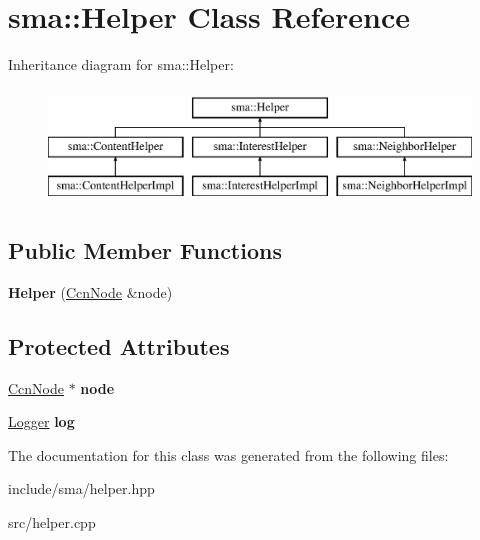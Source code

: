 \hypertarget{classsma_1_1Helper}{\section{sma\-:\-:Helper Class Reference}
\label{classsma_1_1Helper}
}
Inheritance diagram for sma\-:\-:Helper\-:\begin{figure}[H]
\begin{center}
\leavevmode
\includegraphics[height=3.000000cm]{classsma_1_1Helper}
\end{center}
\end{figure}
\subsection*{Public Member Functions}
\begin{DoxyCompactItemize}
\item 
\hypertarget{classsma_1_1Helper_ad7183fc108e95cea361bd1637aaef450}{{\bfseries Helper} (\hyperlink{classsma_1_1CcnNode}{Ccn\-Node} \&node)}\label{classsma_1_1Helper_ad7183fc108e95cea361bd1637aaef450}

\end{DoxyCompactItemize}
\subsection*{Protected Attributes}
\begin{DoxyCompactItemize}
\item 
\hypertarget{classsma_1_1Helper_a8a414c1a1e79e1665edc2abedcee6e38}{\hyperlink{classsma_1_1CcnNode}{Ccn\-Node} $\ast$ {\bfseries node}}\label{classsma_1_1Helper_a8a414c1a1e79e1665edc2abedcee6e38}

\item 
\hypertarget{classsma_1_1Helper_a154d33475a59fb49fcad4ba2288d7ef9}{\hyperlink{structsma_1_1Logger}{Logger} {\bfseries log}}\label{classsma_1_1Helper_a154d33475a59fb49fcad4ba2288d7ef9}

\end{DoxyCompactItemize}


The documentation for this class was generated from the following files\-:\begin{DoxyCompactItemize}
\item 
include/sma/helper.\-hpp\item 
src/helper.\-cpp\end{DoxyCompactItemize}
